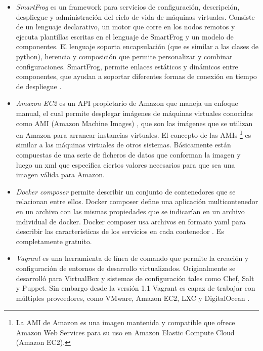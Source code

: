 \documentclass[conference, spanish]{IEEEtran}
\begin{document}
\begin{itemize}
\item \emph{SmartFrog} es un framework para servicios de configuración, descripción, despliegue y administración del ciclo de vida de máquinas virtuales. Consiste de un lenguaje declarativo, un motor que corre en los nodos remotos y ejecuta plantillas escritas en el lenguaje de SmartFrog y un modelo de componentes. El lenguaje soporta encapsulación (que es similar a las clases de python), herencia y composición que permite personalizar y combinar configuraciones. SmartFrog, permite enlaces estáticos y dinámicos entre componentes, que ayudan a soportar diferentes formas de conexión en tiempo de despliegue \cite{smart16}.

\item \emph{Amazon EC2} es un API propietario de Amazon que maneja un enfoque manual, el cual permite desplegar imágenes de máquinas virtuales conocidas como AMI (Amazon Machine Images) \cite{Amazon16}, que son las imágenes que se utilizan en Amazon para arrancar instancias virtuales. El concepto de las AMIs \footnote{La AMI de Amazon es una imagen mantenida y compatible que ofrece Amazon Web Services para su uso en Amazon Elastic Compute Cloud (Amazon EC2).} es similar a las máquinas virtuales de otros sistemas. Básicamente están compuestas de una serie de ficheros de datos que conforman la imagen y luego un xml que especifica ciertos valores necesarios para que sea una imagen válida para Amazon.

\item \emph{Docker composer} permite describir un conjunto de contenedores que se relacionan entre ellos. Docker composer define una aplicación multicontenedor en un archivo con las mismas propiedades que se indicarían en un archivo individual de docker. Docker composer usa archivos en formato yaml para describir las características de los servicios en cada contenedor \cite{doccom16}. Es completamente gratuito.

\item \emph{Vagrant} es una herramienta de línea de comando que permite la creación y configuración de entornos de desarrollo virtualizados. Originalmente se desarrolló para VirtualBox y sistemas de configuración tales como Chef, Salt y Puppet. Sin embargo desde la versión 1.1 Vagrant es capaz de trabajar con múltiples proveedores, como VMware, Amazon EC2, LXC y DigitalOcean \cite{Vag15}.


\end{itemize}
\end{document}
